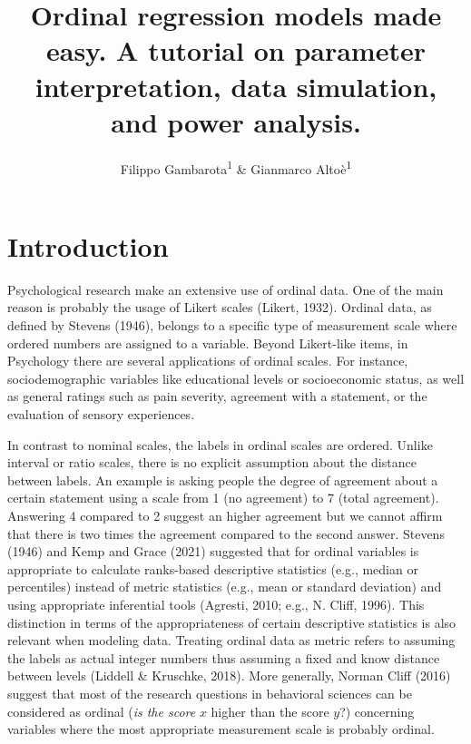\documentclass[
  man, mask,floatsintext]{apa6}
\title{Ordinal regression models made easy. A tutorial on parameter interpretation, data simulation, and power analysis.}
\author{Filippo Gambarota\textsuperscript{1} \& Gianmarco Altoè\textsuperscript{1}}
\date{}
\affiliation{\vspace{0.5cm}\textsuperscript{1} Department of Developmental Psychology and Socialization, University of Padova, Italy}
\begin{document}
\maketitle

\scriptsize

\normalsize

\scriptsize

\normalsize

\section{Introduction}\label{introduction}

Psychological research make an extensive use of ordinal data. One of the main reason is probably the usage of Likert scales (Likert, 1932). Ordinal data, as defined by Stevens (1946), belongs to a specific type of measurement scale where ordered numbers are assigned to a variable. Beyond Likert-like items, in Psychology there are several applications of ordinal scales. For instance, sociodemographic variables like educational levels or socioeconomic status, as well as general ratings such as pain severity, agreement with a statement, or the evaluation of sensory experiences.

In contrast to nominal scales, the labels in ordinal scales are ordered. Unlike interval or ratio scales, there is no explicit assumption about the distance between labels. An example is asking people the degree of agreement about a certain statement using a scale from 1 (no agreement) to 7 (total agreement). Answering 4 compared to 2 suggest an higher agreement but we cannot affirm that there is two times the agreement compared to the second answer. Stevens (1946) and Kemp and Grace (2021) suggested that for ordinal variables is appropriate to calculate ranks-based descriptive statistics (e.g., median or percentiles) instead of metric statistics (e.g., mean or standard deviation) and using appropriate inferential tools (Agresti, 2010; e.g., N. Cliff, 1996). This distinction in terms of the appropriateness of certain descriptive statistics is also relevant when modeling data. Treating ordinal data as metric refers to assuming the labels as actual integer numbers thus assuming a fixed and know distance between levels (Liddell \& Kruschke, 2018). More generally, Norman Cliff (2016) suggest that most of the research questions in behavioral sciences can be considered as ordinal (\emph{is the score} \(x\) higher than the score \(y\)?) concerning variables where the most appropriate measurement scale is probably ordinal.
\end{document}
